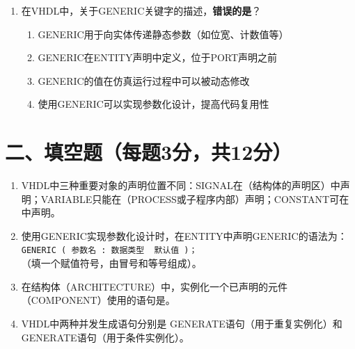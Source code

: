 \begin{enumerate}[label=\arabic*.]
\item 在VHDL中，关于GENERIC关键字的描述，\textbf{错误的是}？
\begin{enumerate}[label=\Alph*.]
  \item GENERIC用于向实体传递静态参数（如位宽、计数值等）
  \item GENERIC在ENTITY声明中定义，位于PORT声明之前
  \item GENERIC的值在仿真运行过程中可以被动态修改
  \item 使用GENERIC可以实现参数化设计，提高代码复用性
\end{enumerate}

\end{enumerate}

\newpage

\section*{二、填空题（每题3分，共12分）}

\begin{enumerate}[label=\arabic*.]

\item VHDL中三种重要对象的声明位置不同：SIGNAL在\underline{\hspace{3cm}}（结构体的声明区）中声明；VARIABLE只能在\underline{\hspace{3cm}}（PROCESS或子程序内部）声明；CONSTANT可在\underline{\hspace{3cm}}中声明。

\item 使用GENERIC实现参数化设计时，在ENTITY中声明GENERIC的语法为：\\[3pt]
\verb|GENERIC ( 参数名 : 数据类型 |\underline{\hspace{2cm}}\verb| 默认值 )；|\\[3pt]
\noindent（填一个赋值符号，由冒号和等号组成）。

\item 在结构体（ARCHITECTURE）中，实例化一个已声明的元件（COMPONENT）使用的语句是\underline{\hspace{4cm}}。

\item VHDL中两种并发生成语句分别是\underline{\hspace{2cm}} GENERATE语句（用于重复实例化）和\underline{\hspace{2cm}} GENERATE语句（用于条件实例化）。

\end{enumerate}

